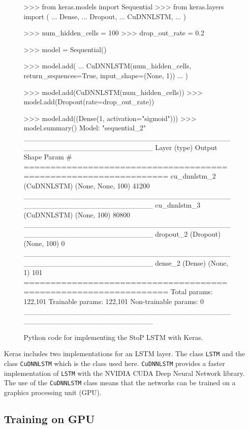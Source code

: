 \begin{figure}[!htbp]
\begin{usagepy}
    >>> from keras.models import Sequential
>>> from keras.layers import (
...     Dense,
...     Dropout,
...     CuDNNLSTM,
... )

>>> num_hidden_cells = 100
>>> drop_out_rate = 0.2

>>> model = Sequential()

>>> model.add(
...     CuDNNLSTM(num_hidden_cells, return_sequences=True, input_shape=(None, 1))
... )

>>> model.add(CuDNNLSTM(num_hidden_cells))
>>> model.add(Dropout(rate=drop_out_rate))

>>> model.add((Dense(1, activation="sigmoid")))
>>> model.summary()
Model: "sequential_2"
_________________________________________________________________
Layer (type)                 Output Shape              Param #   
=================================================================
cu_dnnlstm_2 (CuDNNLSTM)     (None, None, 100)         41200     
_________________________________________________________________
cu_dnnlstm_3 (CuDNNLSTM)     (None, 100)               80800     
_________________________________________________________________
dropout_2 (Dropout)          (None, 100)               0         
_________________________________________________________________
dense_2 (Dense)              (None, 1)                 101       
=================================================================
Total params: 122,101
Trainable params: 122,101
Non-trainable params: 0
_________________________________________________________________

\end{usagepy}
\caption{Python code for implementing the StoP LSTM with Keras.}\label{fig:keras_sequence_to_probability}
\end{figure}

Keras includes two implementations for an LSTM layer. The class
\texttt{LSTM} and the class \texttt{CuDNNLSTM} which is
the class used here. \texttt{CuDNNLSTM} provides a faster
implementation of \texttt{LSTM} with the NVIDIA CUDA Deep Neural Network
library. The use of the \texttt{CuDNNLSTM} class means that the networks
can be trained on a graphics processing unit (GPU).

\subsection{Training on GPU}

